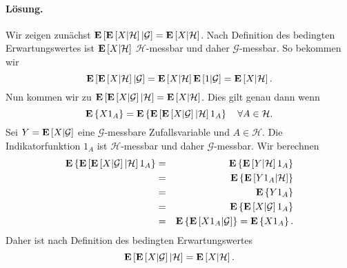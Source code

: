 \paragraph*{Lösung.} Wir zeigen zunächst 
$\mathbf{E}\left[ \mathbf{E}\left[ X | \mathcal H \right] | \mathcal G \right]=\mathbf{E} \left[ X | \mathcal H \right]$.
Nach Definition des bedingten Erwartungswertes ist $\mathbf{E}\left[ X| \mathcal H \right]$ 
$\mathcal H$-messbar und daher $\mathcal G$-messbar. So bekommen wir 
\begin{equation}
	\mathbf{E}\left[ \mathbf{E}\left[ X | \mathcal H \right] | \mathcal G \right] =
	\mathbf{E}\left[ X| \mathcal H \right] \mathbf{E}\left[ 1|\mathcal G \right] = 
	\mathbf{E} \left[ X | \mathcal H \right ].
\end{equation}
Nun kommen wir zu 
$\mathbf{E}\left[ \mathbf{E}\left[ X | \mathcal G \right] | \mathcal H \right]=\mathbf{E} \left[ X | \mathcal H \right]$.
Dies gilt genau dann wenn 
\begin{equation}
	\mathbf{E}\left\{ X 1_A \right\} 
	= \mathbf{E}\left\{ \mathbf{E}\left[ \mathbf{E}\left[ X|\mathcal G \right]|\mathcal H \right] 1_A \right\}  
	\quad \forall A\in\mathcal H.
\end{equation}
Sei $Y=\mathbf{E}\left[ X|\mathcal G \right]$ eine $\mathcal G$-messbare Zufallsvariable und
$A\in\mathcal H$. Die Indikatorfunktion $1_A$ ist $\mathcal H$-messbar und daher
$\mathcal G$-messbar. Wir berechnen
\begin{eqnarray}
	\mathbf{E}\left\{ \mathbf{E}\left[ \mathbf{E}\left[ X|\mathcal G \right]|\mathcal H \right] 1_A \right\} &=& 
	\mathbf{E}\left\{ \mathbf{E}\left[ Y|\mathcal H \right] 1_A \right\} \\
	&=& \mathbf{E}\left\{ \mathbf{E}\left[ Y 1_A| \mathcal H \right] \right\} \\
	&=& \mathbf{E}\left\{ Y 1_A \right\} \\
	&=& \mathbf{E}\left\{ \mathbf{E}\left[ X|\mathcal G \right] 1_A \right\} \\
	&=& \mathbf{E}\left\{ \mathbf{E}\left[ X 1_A| \mathcal G \right] \right\} = \mathbf{E}\left\{ X 1_A \right\}. 
\end{eqnarray}
Daher ist nach Definition des bedingten Erwartungswertes
\begin{equation}
	\mathbf{E}\left[ \mathbf{E}\left[ X | \mathcal G \right] | \mathcal H \right]=\mathbf{E} \left[ X | \mathcal H \right].
\end{equation}




